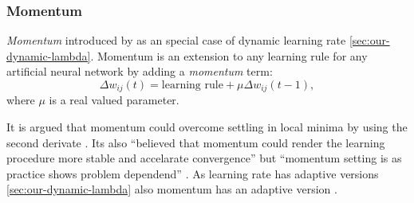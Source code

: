 \subsubsection{Momentum}
\label{sec:our-momentum}

\emph{Momentum} introduced by \citet{jacobs1988increased} as an special case of dynamic learning rate \ref{sec:our-dynamic-lambda}. Momentum is an extension to any learning rule for any artificial neural network by adding a \emph{momentum} term: 
\begin{equation} 
  \Delta w_{ij}(t) = \mbox{learning rule} + \mu \Delta w_{ij}(t-1), \nonumber
\end{equation} 
where $\mu$ is a real valued parameter. 

It is argued that momentum could overcome settling in local minima by using the second derivate  \citep{phansalkar1994analysis}. Its also \enquote{believed that momentum could render the learning procedure more stable and accelarate convergence} but \enquote{momentum setting is as practice shows problem dependend} \citep{riedmiller1993direct}. As learning rate has adaptive versions \ref{sec:our-dynamic-lambda} also momentum has an adaptive version \citep{miniani1990acceleration}. 
